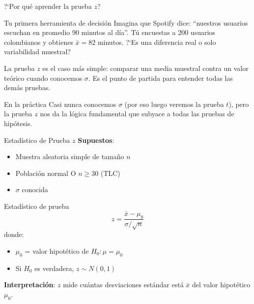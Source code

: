 \documentclass[aspectratio=169, 11pt]{beamer}
\begin{document}
\begin{frame}{?`Por qu\'e aprender la prueba $z$?}
\small
\begin{exampleblock}{Tu primera herramienta de decisi\'on}
Imagina que Spotify dice: ``nuestros usuarios escuchan en promedio 90 minutos al d\'ia''. T\'u encuestas a 200 usuarios colombianos y obtienes $\bar{x} = 82$ minutos. ?`Es una diferencia real o solo variabilidad muestral?
\end{exampleblock}

\vspace{0.2cm}
La prueba $z$ es el caso m\'as simple: comparar una media muestral contra un valor te\'orico cuando conocemos $\sigma$. Es el punto de partida para entender todas las dem\'as pruebas.

\vspace{0.2cm}
\begin{block}{En la pr\'actica}
Casi nunca conocemos $\sigma$ (por eso luego veremos la prueba $t$), pero la prueba $z$ nos da la \alert{l\'ogica fundamental} que subyace a todas las pruebas de hip\'otesis.
\end{block}
\end{frame}

\begin{frame}{Estadístico de Prueba $z$}
\textbf{Supuestos}:
\begin{itemize}
  \item Muestra aleatoria simple de tamaño $n$
  \item Población normal O $n \geq 30$ (TLC)
  \item $\sigma$ conocida
\end{itemize}

\vspace{0.3cm}
\begin{block}{Estadístico de prueba}
\[
z = \frac{\bar{x} - \mu_0}{\sigma / \sqrt{n}}
\]
donde:
\begin{itemize}
  \item $\mu_0$ = valor hipotético de $H_0: \mu = \mu_0$
  \item Si $H_0$ es verdadera, $z \sim N(0,1)$
\end{itemize}
\end{block}

\vspace{0.3cm}
\textbf{Interpretación}: $z$ mide cuántas desviaciones estándar está $\bar{x}$ del valor hipotético $\mu_0$.
\end{frame}
\end{document}
